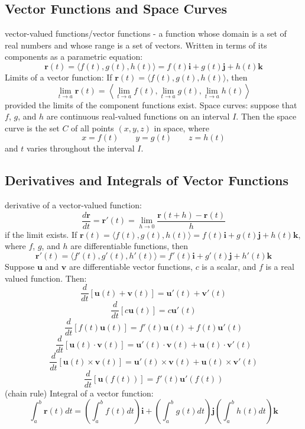 \documentclass{article}
\begin{document}
    \subsection{Vector Functions and Space Curves} %
    \begin{outline}
        \1 vector-valued functions/vector functions - a function whose domain is a set of real numbers and whose range is a set of vectors. Written in terms of its components as a parametric equation: \[\mathbf r(t)=\langle f(t),g(t),h(t)\rangle=f(t)\mathbf i+g(t)\mathbf j+h(t)\mathbf k\]
        \1 Limits of a vector function: If \(\mathbf r(t)=\langle f(t),g(t),h(t)\rangle\), then \[\lim_{t\to a}\mathbf r(t)=\left\langle\lim_{t\to a}f(t),\lim_{t\to a}g(t),\lim_{t\to a}h(t)\right\rangle\] provided the limits of the component functions exist. 
        \1 Space curves: suppose that $f$, $g$, and $h$ are continuous real-valued functions on an interval $I$. Then the space curve is the set $C$ of all points \((x,y,z)\) in space, where \[x=f(t)\qquad y=g(t)\qquad z=h(t)\] and $t$ varies throughout the interval $I$. 
    \end{outline}
    \subsection{Derivatives and Integrals of Vector Functions}
    \begin{outline}
        \1 derivative of a vector-valued function: \[\dfrac{d\mathbf r}{dt}=\mathbf r'(t)=\lim_{h\to 0}\dfrac{\mathbf r(t+h)-\mathbf r(t)}{h}\] if the limit exists. 
        \1 If \(\mathbf r(t)=\langle f(t),g(t),h(t)\rangle=f(t)\mathbf i+g(t)\mathbf j+h(t)\mathbf k\), where $f$, $g$, and $h$ are differentiable functions, then \[\mathbf r'(t)=\langle f'(t),g'(t),h'(t)\rangle =f'(t)\mathbf i+g'(t)\mathbf j+h'(t)\mathbf k\]
        \1 Suppose $\mathbf u$ and $\mathbf v$ are differentiable vector functions, $c$ is a scalar, and $f$ is a real valued function. Then: 
            \2 \[\dfrac{d}{dt}[\mathbf u(t)+\mathbf v(t)]=\mathbf u'(t)+\mathbf v'(t)\]
            \2 \[\dfrac{d}{dt}[c\mathbf u(t)]=c\mathbf u'(t)\]
            \2 \[\dfrac{d}{dt}[f(t)\mathbf u(t)]=f'(t)\mathbf u(t)+f(t)\mathbf u'(t)\]
            \2 \[\dfrac{d}{dt}[\mathbf u(t)\cdot\mathbf v(t)]=\mathbf u'(t)\cdot\mathbf v(t)+\mathbf u(t)\cdot\mathbf v'(t)\]
            \2 \[\dfrac{d}{dt}[\mathbf u(t)\times\mathbf v(t)]=\mathbf u'(t)\times\mathbf v(t)+\mathbf u(t)\times\mathbf v'(t)\]
            \2 \[\dfrac{d}{dt}[\mathbf u(f(t))]=f'(t)\mathbf u'(f(t))\] (chain rule)
        \1 Integral of a vector function: \[\int^b_a\mathbf r(t)dt=\left(\int^b_af(t)dt\right)\mathbf i+\left(\int^b_ag(t)dt\right)\mathbf j\left(\int^b_ah(t)dt\right)\mathbf k\]
        
    \end{outline}
\end{document}
